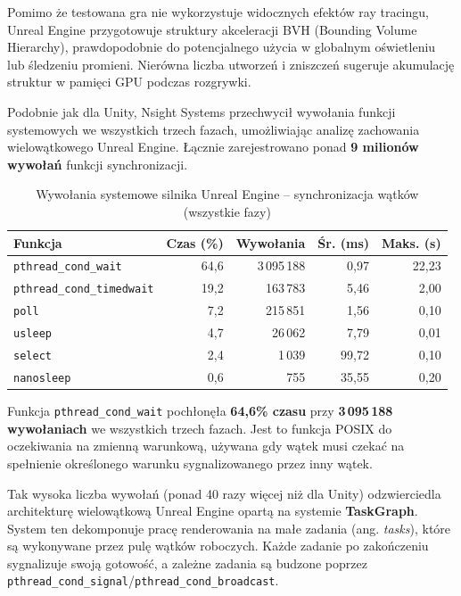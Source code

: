 Pomimo że testowana gra nie wykorzystuje widocznych efektów ray tracingu, Unreal Engine przygotowuje struktury akceleracji BVH 
(Bounding Volume Hierarchy), prawdopodobnie do potencjalnego użycia w globalnym oświetleniu lub śledzeniu promieni. Nierówna liczba utworzeń 
i zniszczeń sugeruje akumulację struktur w pamięci GPU podczas rozgrywki.


Podobnie jak dla Unity, Nsight Systems przechwycił wywołania funkcji systemowych we wszystkich trzech fazach, umożliwiając analizę zachowania 
wielowątkowego Unreal Engine. Łącznie zarejestrowano ponad \textbf{9 milionów wywołań} funkcji synchronizacji.

\begin{table}[H]
\centering
\caption{Wywołania systemowe silnika Unreal Engine -- synchronizacja wątków (wszystkie fazy)}
\label{tab:unreal-osrt-sync}
\small
\begin{tabular}{|l|r|r|r|r|}
\hline
\textbf{Funkcja} & \textbf{Czas (\%)} & \textbf{Wywołania} & \textbf{Śr. (ms)} & \textbf{Maks. (s)} \\
\hline
\texttt{pthread\_cond\_wait} & 64,6 & 3\,095\,188 & 0,97 & 22,23 \\
\texttt{pthread\_cond\_timedwait} & 19,2 & 163\,783 & 5,46 & 2,00 \\
\texttt{poll} & 7,2 & 215\,851 & 1,56 & 0,10 \\
\texttt{usleep} & 4,7 & 26\,062 & 7,79 & 0,01 \\
\texttt{select} & 2,4 & 1\,039 & 99,72 & 0,10 \\
\texttt{nanosleep} & 0,6 & 755 & 35,55 & 0,20 \\
\hline
\end{tabular}
\end{table}

Funkcja \texttt{pthread\_cond\_wait} pochłonęła \textbf{64,6\% czasu} przy \textbf{3\,095\,188 wywołaniach} we wszystkich trzech fazach. 
Jest to funkcja POSIX do oczekiwania na zmienną warunkową, używana gdy wątek musi czekać na spełnienie określonego warunku sygnalizowanego przez 
inny wątek.

Tak wysoka liczba wywołań (ponad 40 razy więcej niż dla Unity) 
odzwierciedla architekturę wielowątkową Unreal Engine opartą na systemie 
\textbf{TaskGraph}. System ten dekomponuje pracę renderowania na małe zadania (ang. \textit{tasks}), 
które są wykonywane przez pulę wątków roboczych. 
Każde zadanie po zakończeniu sygnalizuje swoją gotowość, a zależne zadania są budzone poprzez 
\texttt{pthread\_cond\_signal}/\texttt{pthread\_cond\_broadcast}.

